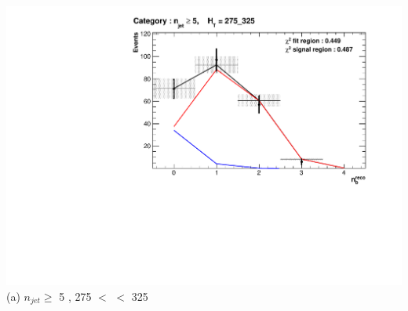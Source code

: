 \begin{minipage}{\textwidth}
\footnotesize
\centering
\begin{minipage}[b]{0.50\linewidth}
\includegraphics[width = 1.0\linewidth]{plots/ThesisPlots/Final_Fit_To_Data_Normal_Medium_HTBin_OneMuon_275_325_jet_mult_5.pdf}
\centering (a) $n_{jet} \geq$  5 , 275 $<$ \theht $<$ 325
\end{minipage}
\end{minipage}
